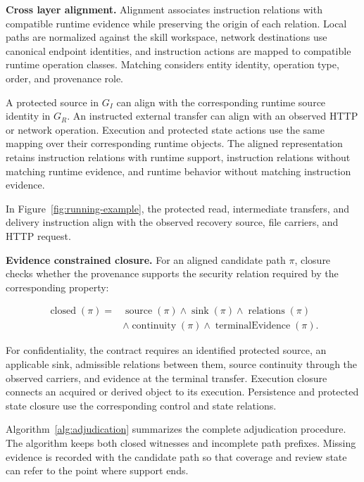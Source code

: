 \textbf{Cross layer alignment.}
Alignment associates instruction relations with compatible runtime evidence
while preserving the origin of each relation. Local paths are normalized
against the skill workspace, network destinations use canonical endpoint
identities, and instruction actions are mapped to compatible runtime operation
classes. Matching considers entity identity, operation type, order, and
provenance role.

A protected source in $G_I$ can align with the corresponding runtime source
identity in $G_R$. An instructed external transfer can align with an observed
HTTP or network operation. Execution and protected state actions use the same
mapping over their corresponding runtime objects. The aligned representation
retains instruction relations with runtime support, instruction relations
without matching runtime evidence, and runtime behavior without matching
instruction evidence.

In Figure~\ref{fig:running-example}, the protected read, intermediate
transfers, and delivery instruction align with the observed recovery source,
file carriers, and HTTP request.


\textbf{Evidence constrained closure.}
For an aligned candidate path $\pi$, closure checks whether the provenance
supports the security relation required by the corresponding property:

\[
\begin{aligned}
\operatorname{closed}(\pi) ={}&
\operatorname{source}(\pi)
\land \operatorname{sink}(\pi)
\land \operatorname{relations}(\pi) \\
&\land \operatorname{continuity}(\pi)
\land \operatorname{terminalEvidence}(\pi).
\end{aligned}
\]

For confidentiality, the contract requires an identified protected source, an
applicable sink, admissible relations between them, source continuity through
the observed carriers, and evidence at the terminal transfer. Execution
closure connects an acquired or derived object to its execution. Persistence
and protected state closure use the corresponding control and state
relations.

Algorithm~\ref{alg:adjudication} summarizes the complete adjudication
procedure. The algorithm keeps both closed witnesses and incomplete path
prefixes. Missing evidence is recorded with the candidate path so that
coverage and review state can refer to the point where support ends.

